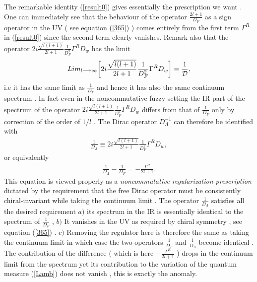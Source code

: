\documentclass[a4paper,10pt]{article}
\begin{document}
The remarkable identity (\ref{result0}) gives essentially the
prescription we want . One can immediately see that the behaviour
of the operator $\frac{2l+1}{D_F}$ as a sign operator in the UV (
see equation (\ref{365}) ) comes entirely from the first term
${\Gamma}^R$ in (\ref{result0}) since the second term clearly
vanishes. Remark also that the operator
$2i\frac{\sqrt{l(l+1)}}{2l+1}\frac{1}{D_F^2}{\Gamma}^RD_{w}$ has
the limit
\begin{eqnarray}
Lim_{l{\longrightarrow}{\infty}}\bigg[2i\frac{\sqrt{l(l+1)}}{2l+1}\frac{1}{D_F^2}{\Gamma}^RD_{w}\bigg]=\frac{1}{{\cal
D}},
\end{eqnarray}
i.e it has the same limit as $\frac{1}{D_F}$ and hence it has
also the same continuum spectrum . In fact even in the
noncommutative fuzzy setting the IR part of the spectrum of the
operator $
2i\frac{\sqrt{l(l+1)}}{2l+1}\frac{1}{D_F^2}{\Gamma}^RD_{w}$
differs from that of $\frac{1}{D_F}$ only by correction of the
order of $1/l$ . The Dirac operator $D_{\Lambda}^{-1}$ can
therefore be identified with
\begin{eqnarray}
\frac{1}{D_{\Lambda}}{\equiv}2i\frac{\sqrt{l(l+1)}}{2l+1}\frac{1}{D_F^2}{\Gamma}^RD_{w},
\end{eqnarray}
or equivalently
\begin{eqnarray}
\frac{1}{D_{\Lambda}}-\frac{1}{D_{F}}=-\frac{{\Gamma}^R}{2l+1}.\label{Dlambda}
\end{eqnarray}
This equation is viewed properly as a {\it noncommutative
regularization prescription} dictated by the requirement that the
free Dirac operator must be consistently chiral-invariant while
taking the continuum limit . The operator $\frac{1}{D_{\Lambda}}$
satisfies all the desired requirement  $a)$ its spectrum in the
IR is essentially identical to the spectrum of $\frac{1}{D_F}$ ,
 $b)$ It vanishes in the UV as required by chiral symmetry , see equation (\ref{365}) .
$c)$ Removing the regulator here is therefore the same as taking
the continuum limit in which case the two operators
$\frac{1}{D_F}$ and $\frac{1}{D_{\Lambda}}$ become identical .
The contribution of the difference ( which is here
$-\frac{{\Gamma}^R}{2l+1}$ ) drops in the continuum limit from the
spectrum yet its contribution to the variation of the quantum
measure (\ref{Lamb}) does not vanish , this is exactly the
anomaly.
\end{document}
